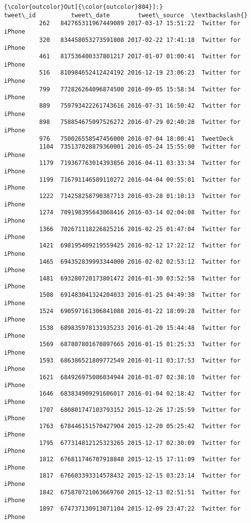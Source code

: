 \documentclass[11pt]{article}
\begin{document}
\begin{Verbatim}[commandchars=\\\{\}]
{\color{outcolor}Out[{\color{outcolor}804}]:}                 tweet\_id          tweet\_date        tweet\_source  \textbackslash{}
          262   842765311967449089 2017-03-17 15:51:22  Twitter for iPhone   
          320   834458053273591808 2017-02-22 17:41:18  Twitter for iPhone   
          461   817536400337801217 2017-01-07 01:00:41  Twitter for iPhone   
          516   810984652412424192 2016-12-19 23:06:23  Twitter for iPhone   
          799   772826264096874500 2016-09-05 15:58:34  Twitter for iPhone   
          889   759793422261743616 2016-07-31 16:50:42  Twitter for iPhone   
          898   758854675097526272 2016-07-29 02:40:28  Twitter for iPhone   
          976   750026558547456000 2016-07-04 18:00:41  TweetDeck            
          1104  735137028879360001 2016-05-24 15:55:00  Twitter for iPhone   
          1179  719367763014393856 2016-04-11 03:33:34  Twitter for iPhone   
          1199  716791146589110272 2016-04-04 00:55:01  Twitter for iPhone   
          1222  714258258790387713 2016-03-28 01:10:13  Twitter for iPhone   
          1274  709198395643068416 2016-03-14 02:04:08  Twitter for iPhone   
          1366  702671118226825216 2016-02-25 01:47:04  Twitter for iPhone   
          1421  698195409219559425 2016-02-12 17:22:12  Twitter for iPhone   
          1465  694352839993344000 2016-02-02 02:53:12  Twitter for iPhone   
          1481  693280720173801472 2016-01-30 03:52:58  Twitter for iPhone   
          1508  691483041324204033 2016-01-25 04:49:38  Twitter for iPhone   
          1524  690597161306841088 2016-01-22 18:09:28  Twitter for iPhone   
          1538  689835978131935233 2016-01-20 15:44:48  Twitter for iPhone   
          1569  687807801670897665 2016-01-15 01:25:33  Twitter for iPhone   
          1593  686386521809772549 2016-01-11 03:17:53  Twitter for iPhone   
          1621  684926975086034944 2016-01-07 02:38:10  Twitter for iPhone   
          1646  683834909291606017 2016-01-04 02:18:42  Twitter for iPhone   
          1707  680801747103793152 2015-12-26 17:25:59  Twitter for iPhone   
          1763  678446151570427904 2015-12-20 05:25:42  Twitter for iPhone   
          1795  677314812125323265 2015-12-17 02:30:09  Twitter for iPhone   
          1812  676811746707918848 2015-12-15 17:11:09  Twitter for iPhone   
          1817  676603393314578432 2015-12-15 03:23:14  Twitter for iPhone   
          1842  675870721063669760 2015-12-13 02:51:51  Twitter for iPhone   
          1897  674737130913071104 2015-12-09 23:47:22  Twitter for iPhone   

\end{Verbatim}
\end{document}
